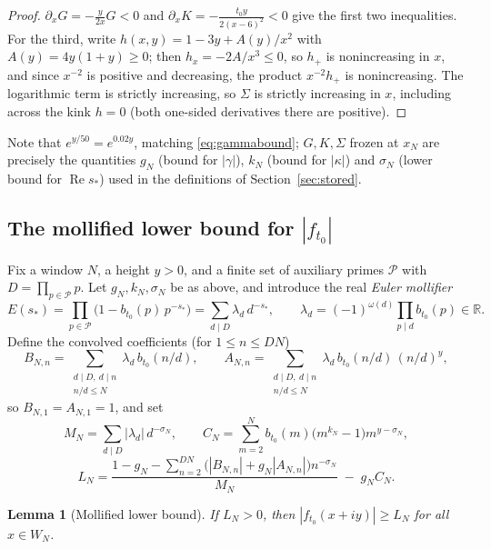\documentclass[11pt]{article}
\newtheorem{lemma}[theorem]{Lemma}
\theoremstyle{definition}
\newcommand{\R}{\mathbb{R}}
\newcommand{\calP}{\mathcal{P}}
\DeclareMathOperator{\Rea}{Re}
\begin{document}
\begin{proof}
$\partial_xG=-\frac{y}{2x}G<0$ and
$\partial_xK=-\frac{t_0y}{2(x-6)^2}<0$ give the first two
inequalities. For the third, write
$h(x,y)=1-3y+A(y)/x^2$ with $A(y)=4y(1+y)\ge0$; then
$h_x=-2A/x^3\le0$, so $h_+$ is nonincreasing in $x$, and since
$x^{-2}$ is positive and decreasing, the product $x^{-2}h_+$ is
nonincreasing. The logarithmic term is strictly increasing, so
$\Sigma$ is strictly increasing in $x$, including across the kink
$h=0$ (both one-sided derivatives there are positive).
\end{proof}

Note that $e^{y/50}=e^{0.02y}$, matching \eqref{eq:gammabound}; $G,K,\Sigma$
frozen at $x_N$ are precisely the quantities $g_N$ (bound for
$|\gamma|$), $k_N$ (bound for $|\kappa|$) and $\sigma_N$ (lower bound
for $\Rea s_*$) used in the definitions of Section~\ref{sec:stored}.

\subsection{The mollified lower bound for
\texorpdfstring{$|f_{t_0}|$}{|f(t0)|}}\label{sec:native}

Fix a window $N$, a height $y>0$, and a finite set of auxiliary primes
$\calP$ with $D=\prod_{p\in\calP}p$. Let $g_N,k_N,\sigma_N$ be as
above, and introduce the real \emph{Euler mollifier}
\[
E(s_*)=\prod_{p\in\calP}\bigl(1-b_{t_0}(p)\,p^{-s_*}\bigr)
=\sum_{d\mid D}\lambda_d\,d^{-s_*},
\qquad
\lambda_d=(-1)^{\omega(d)}\prod_{p\mid d}b_{t_0}(p)\in\R .
\]
Define the convolved coefficients (for $1\le n\le DN$)
\[
B_{N,n}=\sum_{\substack{d\mid D,\ d\mid n\\ n/d\le N}}
\lambda_d\,b_{t_0}(n/d),
\qquad
A_{N,n}=\sum_{\substack{d\mid D,\ d\mid n\\ n/d\le N}}
\lambda_d\,b_{t_0}(n/d)\,(n/d)^y,
\]
so $B_{N,1}=A_{N,1}=1$, and set
\[
M_N=\sum_{d\mid D}|\lambda_d|\,d^{-\sigma_N},
\qquad
C_N=\sum_{m=2}^{N}b_{t_0}(m)\bigl(m^{k_N}-1\bigr)m^{y-\sigma_N},
\]
\begin{equation}\label{eq:LN}
L_N=\frac{1-g_N-\sum_{n=2}^{DN}
\bigl(|B_{N,n}|+g_N|A_{N,n}|\bigr)n^{-\sigma_N}}{M_N}
\;-\;g_NC_N .
\end{equation}

\begin{lemma}[Mollified lower bound]\label{lem:native}
If $L_N>0$, then $|f_{t_0}(x+iy)|\ge L_N$ for all $x\in W_N$.
\end{lemma}
\end{document}
